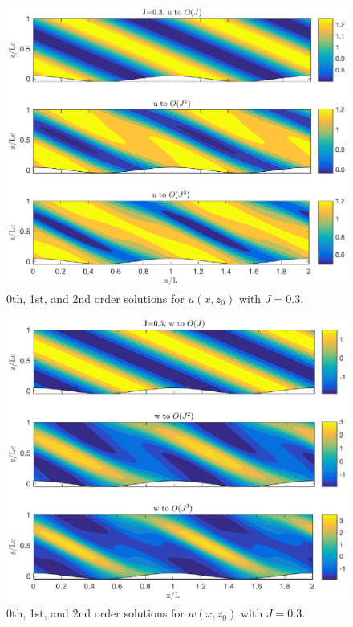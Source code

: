 \documentclass[12pt]{article}
\begin{document}
\begin{figure}
	\centering
	\includegraphics[width=1\textwidth]{u_solutions.eps}
	\caption{0th, 1st, and 2nd order solutions for $u(x,z_0)$ with $J=0.3$.}
\end{figure}

\begin{figure}
	\centering
	\includegraphics[width=1\textwidth]{w_solutions.eps}
	\caption{0th, 1st, and 2nd order solutions for $w(x,z_0)$ with $J=0.3$.}
\end{figure}
\end{document}
